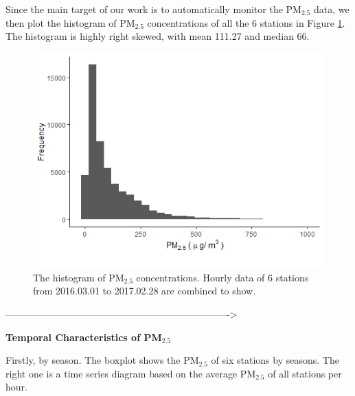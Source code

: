 \documentclass[12pt]{article}
\newcommand{\scsection}[1]
    {\begin{center}
        {\bf\large #1}
    \end{center}
    \vspace{-0.15 cm}
}
\numberwithin{equation}{section}
\begin{document}
Since the main target of our work is to automatically monitor the PM$_{2.5}$ data, we then plot the histogram of PM$_{2.5}$ concentrations of all the 6 stations in Figure \ref{fig:hist}. The histogram is highly right skewed, with mean 111.27 and median 66. 

\begin{figure}[htbp]
	\centering
	\includegraphics[width=12cm]{newhist.png}
	\caption{\footnotesize The histogram of PM$_{2.5}$ concentrations. Hourly data of 6 stations from 2016.03.01 to 2017.02.28 are combined to show.}
	\label{fig:hist}
\end{figure}

---------------------------------------------------------------------->

\scsection{Temporal Characteristics of PM$_{2.5}$}

Firstly, by season. The boxplot shows the  PM$_{2.5}$ of six stations by seasons. The right one is a time series diagram based on the average PM$_{2.5}$ of all stations per hour. 
\end{document}
